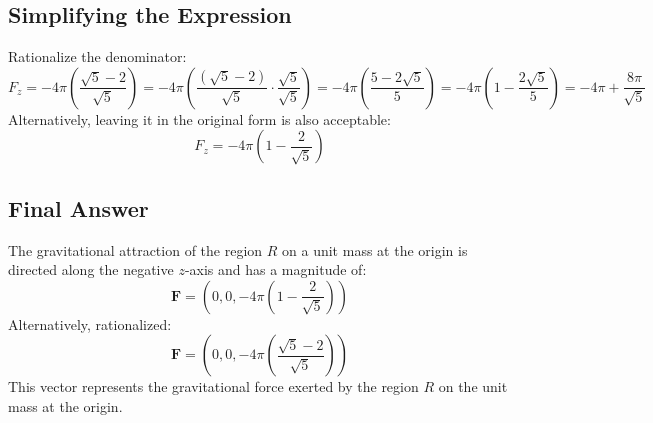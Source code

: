 \documentclass[11pt]{article}
\begin{document}
\newpage

\subsection{Simplifying the Expression}

Rationalize the denominator:
\[
F_z = -4\pi \left( \frac{\sqrt{5} - 2}{\sqrt{5}} \right ) = -4\pi \left( \frac{(\sqrt{5} - 2)}{\sqrt{5}} \cdot \frac{\sqrt{5}}{\sqrt{5}} \right ) = -4\pi \left( \frac{5 - 2\sqrt{5}}{5} \right ) = -4\pi \left( 1 - \frac{2\sqrt{5}}{5} \right ) = -4\pi + \frac{8\pi}{\sqrt{5}}
\]
Alternatively, leaving it in the original form is also acceptable:
\[
F_z = -4\pi \left( 1 - \frac{2}{\sqrt{5}} \right )
\]

\newpage

\subsection{Final Answer}

The gravitational attraction of the region \( R \) on a unit mass at the origin is directed along the negative \( z \)-axis and has a magnitude of:
\[
\mathbf{F} = \left( 0, 0, -4\pi \left( 1 - \frac{2}{\sqrt{5}} \right ) \right )
\]
Alternatively, rationalized:
\[
\mathbf{F} = \left( 0, 0, -4\pi \left( \frac{\sqrt{5} - 2}{\sqrt{5}} \right ) \right )
\]
This vector represents the gravitational force exerted by the region \( R \) on the unit mass at the origin.
\end{document}
